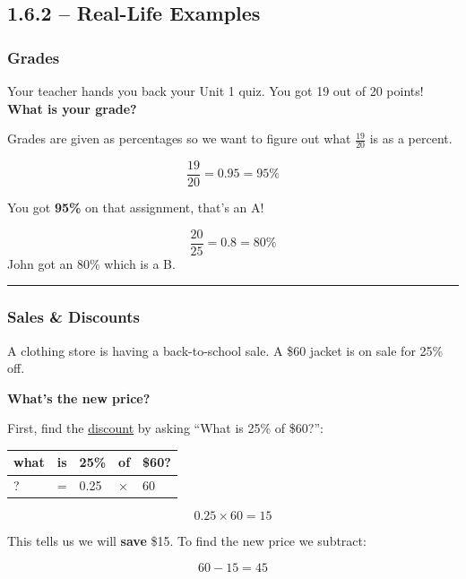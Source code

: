 \documentclass[
  letterpaper,
  DIV=11,
  numbers=noendperiod]{scrreprt}
\begin{document}
\subsection*{1.6.2 -- Real-Life Examples}\label{real-life-examples}

\subsubsection*{Grades}\label{grades}

Your teacher hands you back your Unit 1 quiz. You got 19 out of 20
points! \textbf{What is your grade?}

Grades are given as percentages so we want to figure out what
\(\frac{19}{20}\) is as a percent.

\[
\frac{19}{20} = 0.95 = 95\%
\]

You got \textbf{95\%} on that assignment, that's an A!

\[
\frac{20}{25} = 0.8 = 80\%
\] John got an 80\% which is a B.

\begin{center}\rule{0.5\linewidth}{0.5pt}\end{center}

\subsubsection*{Sales \& Discounts}\label{sales-discounts}

A clothing store is having a back-to-school sale. A \$60 jacket is on
sale for 25\% off.

\textbf{What's the new price?}

First, find the \href{./glossary.html\#glossary-discount}{discount} by
asking ``What is 25\% of \$60?'':

\begin{longtable}[]{@{}lllll@{}}
\toprule\noalign{}
what & is & 25\% & of & \$60? \\
\midrule\noalign{}
\endhead
\bottomrule\noalign{}
\endlastfoot
? & = & 0.25 & × & 60 \\
\end{longtable}

\[
0.25 \times 60 = 15
\]

This tells us we will \textbf{save} \$15. To find the new price we
subtract:

\[
60 - 15 = 45
\]
\end{document}
